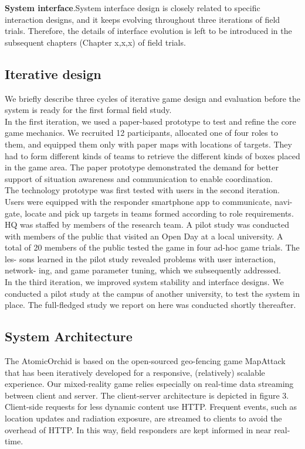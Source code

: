 \textbf{System interface}.System interface design is closely related to specific interaction designs, and it keeps evolving throughout three iterations of field trials. Therefore, the details of interface evolution is left to be introduced in the subsequent chapters (Chapter x,x,x) of field trials. \\

\subsection{Iterative design}
We briefly describe three cycles of iterative game design and evaluation before the system is ready for the first formal field study.\\

In the first iteration, we used a paper-based prototype to test and refine the core game mechanics. We recruited 12 participants, allocated one of four roles to them, and equipped them only with paper maps with locations of targets. They had to form different kinds of teams to retrieve the different kinds of boxes placed in the game area. The paper prototype demonstrated the demand for better support of situation awareness and communication to enable coordination.\\

The technology prototype was first tested with users in the second iteration. Users were equipped with the responder smartphone app to communicate, navi- gate, locate and pick up targets in teams formed according to role requirements. HQ was staffed by members of the research team. A pilot study was conducted with members of the public that visited an Open Day at a local university. A total of 20 members of the public tested the game in four ad-hoc game trials. The les- sons learned in the pilot study revealed problems with user interaction, network- ing, and game parameter tuning, which we subsequently addressed.\\

In the third iteration, we improved system stability and interface designs. We conducted a pilot study at the campus of another university, to test the system in place. The full-fledged study we report on here was conducted shortly thereafter.\\

\subsection{System Architecture}
The AtomicOrchid is based on the open-sourced geo-fencing game MapAttack that has been iteratively developed for a responsive, (relatively) scalable experience. Our mixed-reality game relies especially on real-time data streaming between client and server. The client-server architecture is depicted in figure 3. Client-side requests for less dynamic content use HTTP. Frequent events, such as location updates and radiation exposure, are streamed to clients to avoid the overhead of HTTP. In this way, field responders are kept informed in near real-time.\\

